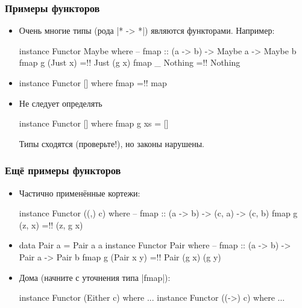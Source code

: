 \documentclass[11pt]{beamer}
\begin{document}
\begin{frame}[fragile]
  \frametitle{Примеры функторов}
  \begin{itemize}
    \item Очень многие типы (рода \haskinline|* -> *|) являются функторами. Например:
          \begin{haskell}
            instance Functor Maybe where 
              -- fmap :: (a -> b) -> Maybe a -> Maybe b
              fmap g (Just x) =!\pause! Just (g x)
              fmap _ Nothing  =!\pause! Nothing
          \end{haskell}
          \pause
    \item
          \begin{haskell}
            instance Functor [] where 
              fmap =!\pause! map
          \end{haskell}
    \item Не следует определять
          \begin{haskell}
            instance Functor [] where 
              fmap g xs = []
          \end{haskell}
          \pause
          Типы сходятся (проверьте!), но законы нарушены.
  \end{itemize}
\end{frame}

\begin{frame}[fragile]
  \frametitle{Ещё примеры функторов}
  \begin{itemize}
    \item Частично применённые кортежи:
          \begin{haskell}
            instance Functor ((,) c) where 
              -- fmap :: (a -> b) -> (c, a) -> (c, b)
              fmap g (z, x) =!\pause! (z, g x)
          \end{haskell}
          \pause
    \item
          \begin{haskell}
            data Pair a = Pair a a
            instance Functor Pair where 
              -- fmap :: (a -> b) -> Pair a -> Pair b
              fmap g (Pair x y) =!\pause! Pair (g x) (g y)
          \end{haskell}
          \pause
    \item Дома (начните с уточнения типа \haskinline|fmap|):
          \begin{haskell}
            instance Functor (Either c) where ...
            instance Functor ((->) c) where ...
          \end{haskell}
  \end{itemize}
\end{frame}
\end{document}

